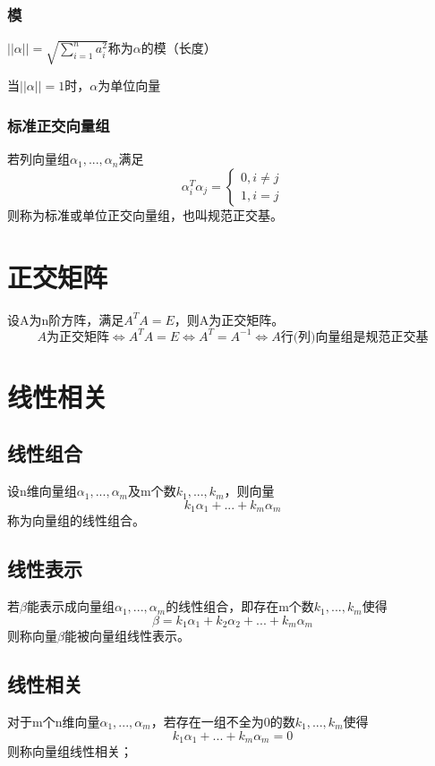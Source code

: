 \subsubsection{模}
\(||\alpha|| = \displaystyle \sqrt{\sum_{i = 1}^{n}a_i^2}\)称为\(\alpha\)的模（长度）

当\(||\alpha|| = 1\)时，\(\alpha\)为单位向量


\subsubsection{标准正交向量组}
若列向量组\(\alpha_1, ..., \alpha_n\)满足\[\alpha_i^T\alpha_j = 
\begin{cases}
0, i \neq j \\ 
1, i = j
\end{cases}
\]则称为标准或单位正交向量组，也叫规范正交基。


\section{正交矩阵}
设A为n阶方阵，满足\(A^TA = E\)，则A为正交矩阵。
\[A\text{为正交矩阵} \Leftrightarrow A^TA = E \Leftrightarrow A^T = A^{-1} \Leftrightarrow A\text{行(列)向量组是规范正交基}\]


\section{线性相关}

\subsection{线性组合}
设n维向量组\(\alpha_1, ..., \alpha_m\)及m个数\(k_1, ..., k_m\)，则向量\[k_1\alpha_1 + ... + k_m\alpha_m\]
称为向量组的线性组合。


\subsection{线性表示}
若\(\beta\)能表示成向量组\(\alpha_1, ..., \alpha_m\)的线性组合，即存在m个数\(k_1, ..., k_m\)使得\[\beta = k_1\alpha_1 + k_2\alpha_2 + ... + k_m\alpha_m\]则称向量\(\beta\)能被向量组线性表示。


\subsection{线性相关}
对于m个n维向量\(\alpha_1, ..., \alpha_m\)，若存在一组不全为0的数\(k_1, ..., k_m\)使得\[k_1\alpha_1 + ... + k_m\alpha_m = 0\]则称向量组线性相关；

